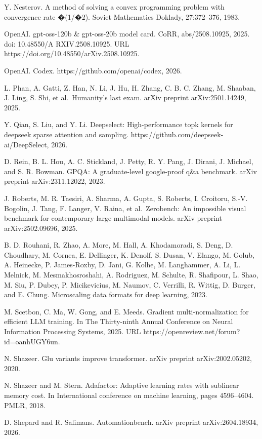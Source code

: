 \documentclass[
  10
]{article}
\begin{document}
Y. Nesterov. A method of solving a convex programming problem with
convergence rate �(1/�2). Soviet Mathematics Doklady, 27:372--376, 1983.

OpenAI. gpt-oss-120b \& gpt-oss-20b model card. CoRR, abs/2508.10925,
2025. doi: 10.48550/A RXIV.2508.10925. URL
https://doi.org/10.48550/arXiv.2508.10925.

OpenAI. Codex. https://github.com/openai/codex, 2026.

L. Phan, A. Gatti, Z. Han, N. Li, J. Hu, H. Zhang, C. B. C. Zhang, M.
Shaaban, J. Ling, S. Shi, et al.~Humanity's last exam. arXiv preprint
arXiv:2501.14249, 2025.

Y. Qian, S. Liu, and Y. Li. Deepselect: High-performance topk kernels
for deepseek sparse attention and sampling.
https://github.com/deepseek-ai/DeepSelect, 2026.

D. Rein, B. L. Hou, A. C. Stickland, J. Petty, R. Y. Pang, J. Dirani, J.
Michael, and S. R. Bowman. GPQA: A graduate-level google-proof q\&a
benchmark. arXiv preprint arXiv:2311.12022, 2023.

J. Roberts, M. R. Taesiri, A. Sharma, A. Gupta, S. Roberts, I. Croitoru,
S.-V. Bogolin, J. Tang, F. Langer, V. Raina, et al.~Zerobench: An
impossible visual benchmark for contemporary large multimodal models.
arXiv preprint arXiv:2502.09696, 2025.

B. D. Rouhani, R. Zhao, A. More, M. Hall, A. Khodamoradi, S. Deng, D.
Choudhary, M. Cornea, E. Dellinger, K. Denolf, S. Dusan, V. Elango, M.
Golub, A. Heinecke, P. James-Roxby, D. Jani, G. Kolhe, M. Langhammer, A.
Li, L. Melnick, M. Mesmakhosroshahi, A. Rodriguez, M. Schulte, R.
Shafipour, L. Shao, M. Siu, P. Dubey, P. Micikevicius, M. Naumov, C.
Verrilli, R. Wittig, D. Burger, and E. Chung. Microscaling data formats
for deep learning, 2023.

M. Scetbon, C. Ma, W. Gong, and E. Meeds. Gradient multi-normalization
for efficient LLM training. In The Thirty-ninth Annual Conference on
Neural Information Processing Systems, 2025. URL
https://openreview.net/forum?id=oanhUGY6un.

N. Shazeer. Glu variants improve transformer. arXiv preprint
arXiv:2002.05202, 2020.

N. Shazeer and M. Stern. Adafactor: Adaptive learning rates with
sublinear memory cost. In International conference on machine learning,
pages 4596--4604. PMLR, 2018.

D. Shepard and R. Salimans. Automationbench. arXiv preprint
arXiv:2604.18934, 2026.
\end{document}
